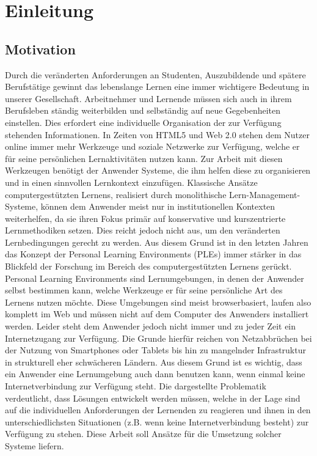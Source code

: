 \chapter{Einleitung} 
\label{chapter:Kapitel1}
\section{Motivation}
Durch die veränderten Anforderungen an Studenten, Auszubildende und spätere Berufstätige gewinnt das lebenslange Lernen eine immer wichtigere Bedeutung in unserer Gesellschaft. Arbeitnehmer und Lernende müssen sich auch in ihrem Berufsleben ständig weiterbilden und selbständig auf neue Gegebenheiten einstellen. Dies erfordert eine individuelle Organisation der zur Verfügung stehenden Informationen. In Zeiten von HTML5 und Web 2.0 stehen dem Nutzer online immer mehr Werkzeuge und soziale Netzwerke zur Verfügung, welche er für seine persönlichen Lernaktivitäten nutzen kann. Zur Arbeit mit diesen Werkzeugen benötigt der Anwender Systeme, die ihm helfen diese zu organisieren und in einen sinnvollen Lernkontext einzufügen. Klassische Ansätze computergestützten Lernens, realisiert durch monolithische Lern-Management-Systeme, können dem Anwender meist nur in institutionellen Kontexten weiterhelfen, da sie ihren Fokus primär auf konservative und kurszentrierte Lernmethodiken setzen. Dies reicht jedoch nicht aus, um den veränderten Lernbedingungen gerecht zu werden. Aus diesem Grund ist in den letzten Jahren das Konzept der Personal Learning Environments (PLEs) immer stärker in das Blickfeld der Forschung im Bereich des computergestützten Lernens gerückt. Personal Learning Environments sind Lernumgebungen, in denen der Anwender selbst bestimmen kann, welche Werkzeuge er für seine persönliche Art des Lernens nutzen möchte. Diese Umgebungen sind meist browserbasiert, laufen also komplett im Web und müssen nicht auf dem Computer des Anwenders installiert werden. 
Leider steht dem Anwender jedoch nicht immer und zu jeder Zeit ein Internetzugang zur Verfügung. Die Grunde hierfür reichen von Netzabbrüchen bei der Nutzung von Smartphones oder Tablets bis hin zu mangelnder Infrastruktur in strukturell eher schwächeren Ländern. Aus diesem Grund ist es wichtig, dass ein Anwender eine Lernumgebung auch dann benutzen kann, wenn einmal keine Internetverbindung zur Verfügung steht. Die dargestellte Problematik verdeutlicht, dass Lösungen entwickelt werden müssen, welche in der Lage sind auf die individuellen Anforderungen der Lernenden zu reagieren und ihnen in den unterschiedlichsten Situationen (z.B. wenn keine Internetverbindung besteht) zur Verfügung zu stehen. Diese Arbeit soll Ansätze für die Umsetzung solcher Systeme liefern.

